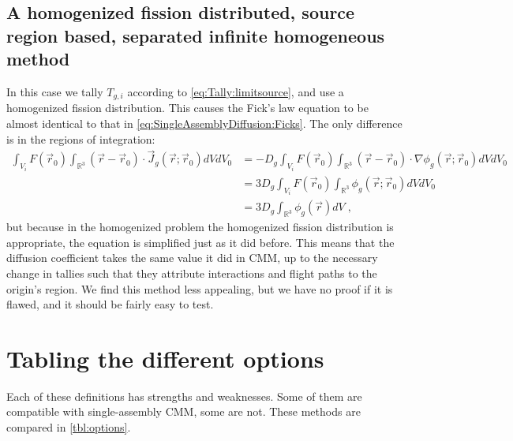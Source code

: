 \documentclass[a4paper,letterpaper,12pt,oneside,draft]{article}
\newcommand{\eec}{\;,}
\newcommand{\allspace}{\ensuremath{\mathbb{R}^3}}
\newcommand{\vr}{\ensuremath{\vec{r}}}
\newcommand{\dvr}{\left(\vr-\vr_0\right)}
\begin{document}
\subsection{A homogenized fission distributed, source region based, separated infinite homogeneous method}
In this case we tally $T_{g,i}$ according to \cref{eq:Tally:limitsource}, and use a homogenized fission distribution.
This causes the Fick's law equation to be almost identical to that in \cref{eq:SingleAssemblyDiffusion:Ficks}. 
The only difference is in the regions of integration:
\begin{align}
    \nonumber
    \int_{V_i} F(\vr_0)\int_{\allspace} \dvr\cdot\vec{J}_g(\vr;\vr_0) dVdV_0 &= -D_g \int_{V_i} F(\vr_0) \int_{\allspace} \dvr\cdot\nabla \phi_g(\vr;\vr_0)dVdV_0 \\\nonumber
    &= 3D_g \int_{V_i} F(\vr_0) \int_{\allspace}\phi_g(\vr;\vr_0)dVdV_0 \\
    \label{eq:HomFissSourceInf}
    &= 3D_g \int_{\allspace}\phi_g(\vr)dV\eec
\end{align}
but because in the homogenized problem the homogenized fission distribution is appropriate, the equation is simplified just as it did before.
This means that the diffusion coefficient takes the same value it did in CMM, up to the necessary change in tallies such that they attribute interactions and flight paths to the origin's region.
We find this method less appealing, but we have no proof if it is flawed, and it should be fairly easy to test.

\section{Tabling the different options}

Each of these definitions has strengths and weaknesses. 
Some of them are compatible with single-assembly CMM, some are not.
These methods are compared in \cref{tbl:options}.
\end{document}
